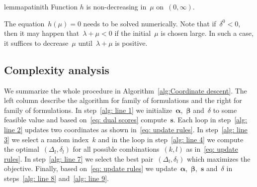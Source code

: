 \begin{restatable}{lemma}{patinith}\label{lemma:problem2}
  Function $h$ is non-decreasing in~$\mu$ on~$(0,\infty)$.
\end{restatable}
  
\noindent The equation~$h(\mu) = 0$ needs to be solved numerically. Note that if~$\delta^0 < 0$, then it may happen that~$\lambda + \mu < 0$ if the initial~$\mu$ is chosen large. In such a case, it suffices to decrease~$\mu$ until~$\lambda + \mu$ is positive.

\subsection{Complexity analysis}

We summarize the whole procedure in Algorithm~\ref{alg:Coordinate descent}. The left column describe the algorithm for \TopPushK family of formulations and the right for \PatMat family of formulations. In step~\ref{alg: line 1} we initialize~$\bm{\alpha}$,~$\bm{\beta}$ and~$\delta$ to some feasible value and based on~\eqref{eq: dual scores} compute~$\bm{s}$. Each \repeatloop loop in step~\ref{alg: line 2} updates two coordinates as shown in~\eqref{eq: update rules}. In step~\ref{alg: line 3} we select a random index~$k$ and in the \forloop loop in step~\ref{alg: line 4} we compute the optimal~$(\Delta_l,\delta_l)$ for all possible combinations~$(k,l)$ as in~\eqref{eq: update rules}. In step~\ref{alg: line 7} we select the best pair~$(\Delta_l,\delta_l)$ which maximizes the objective. Finally, based on~\eqref{eq: update rules} we update~$\bm{\alpha}$,~$\bm{\beta}$,~$\bm{s}$ and~$\delta$ in steps~\ref{alg: line 8} and~\ref{alg: line 9}.

